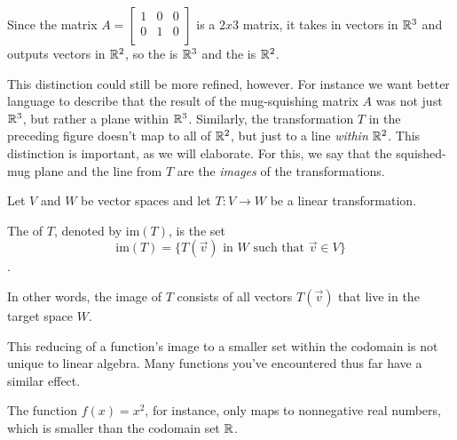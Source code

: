 \documentclass{ximera}
\begin{document}
Since the matrix $A=\begin{bmatrix}
  1&0&0\\
  0&1&0\\
\end{bmatrix}$ is a $2x3$ matrix, it takes in vectors in $\mathbb{R}^3$ and outputs vectors in $\mathbb{R}^2$, so the  is $\mathbb{R}^3$ and the  is $\mathbb{R}^2$.

This distinction could still be more refined, however. For instance we want better language to describe that the result of the mug-squishing matrix $A$ was not just $\mathbb{R}^3$, but rather a plane within $\mathbb{R}^3$. Similarly, the transformation $T$ in the preceding figure doesn't map to all of $\mathbb{R}^2$, but just to a line \emph{within} $\mathbb{R}^2$. This distinction is important, as we will elaborate. For this, we say that the squished-mug plane and the line from $T$ are the \emph{images} of the transformations.

\begin{definition}\label{def:imageofT}
Let $V$ and $W$ be vector spaces and let $T:V\rightarrow W$ be a linear transformation.  

The  of $T$, denoted by $\mbox{im}(T)$, is the set
$$\mbox{im}(T)=\{T(\vec{v})\text{ in }W\text{ such that }\vec{v}\in V\}$$.

In other words, the image of $T$ consists of all vectors $T(\vec{v})$ that live in the target space $W$.
\end{definition}

\begin{remark}
  This reducing of a function's image to a smaller set within the codomain is not unique to linear algebra. Many functions you've encountered thus far have a similar effect. 

  The function $f(x)=x^2$, for instance, only maps to nonnegative real numbers, which is smaller than the codomain set $\mathbb{R}$.
\begin{center}
\end{center}
\end{remark}
 
\end{document}
